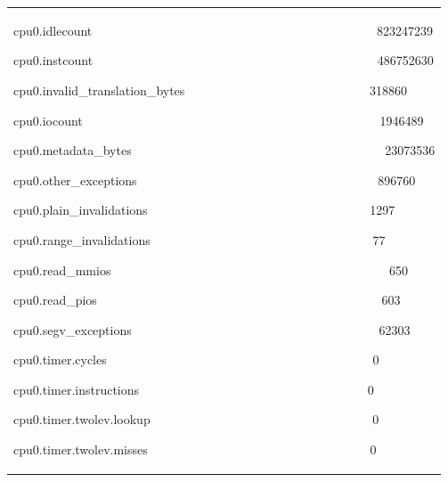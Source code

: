 \documentclass[a4paper]{article}
\begin{document}
\begin{flushleft}
\begin{tiny}
\begin{supertabular}{|m{6.34626in}|}
{\ttfamily cpu0.idlecount
\ \ \ \ \ \ \ \ \ \ \ \ \ \ \ \ \ \ \ \ \ \ \ \ \ \ \ \ \ \ \ \ \ \ \ \ \ \ \ \ \ \ \ \ \ 823247239}

{\ttfamily cpu0.instcount
\ \ \ \ \ \ \ \ \ \ \ \ \ \ \ \ \ \ \ \ \ \ \ \ \ \ \ \ \ \ \ \ \ \ \ \ \ \ \ \ \ \ \ \ \ 486752630}

{\ttfamily cpu0.invalid\_translation\_bytes
\ \ \ \ \ \ \ \ \ \ \ \ \ \ \ \ \ \ \ \ \ \ \ \ \ \ \ \ \ 318860}

{\ttfamily cpu0.iocount
\ \ \ \ \ \ \ \ \ \ \ \ \ \ \ \ \ \ \ \ \ \ \ \ \ \ \ \ \ \ \ \ \ \ \ \ \ \ \ \ \ \ \ \ \ \ \ 1946489}

{\ttfamily cpu0.metadata\_bytes
\ \ \ \ \ \ \ \ \ \ \ \ \ \ \ \ \ \ \ \ \ \ \ \ \ \ \ \ \ \ \ \ \ \ \ \ \ \ \ \ 23073536}

{\ttfamily cpu0.other\_exceptions
\ \ \ \ \ \ \ \ \ \ \ \ \ \ \ \ \ \ \ \ \ \ \ \ \ \ \ \ \ \ \ \ \ \ \ \ \ \ 896760}

{\ttfamily cpu0.plain\_invalidations
\ \ \ \ \ \ \ \ \ \ \ \ \ \ \ \ \ \ \ \ \ \ \ \ \ \ \ \ \ \ \ \ \ \ \ 1297}

{\ttfamily cpu0.range\_invalidations
\ \ \ \ \ \ \ \ \ \ \ \ \ \ \ \ \ \ \ \ \ \ \ \ \ \ \ \ \ \ \ \ \ \ \ 77}

{\ttfamily cpu0.read\_mmios
\ \ \ \ \ \ \ \ \ \ \ \ \ \ \ \ \ \ \ \ \ \ \ \ \ \ \ \ \ \ \ \ \ \ \ \ \ \ \ \ \ \ \ \ 650}

{\ttfamily cpu0.read\_pios
\ \ \ \ \ \ \ \ \ \ \ \ \ \ \ \ \ \ \ \ \ \ \ \ \ \ \ \ \ \ \ \ \ \ \ \ \ \ \ \ \ \ \ \ \ 603}

{\ttfamily cpu0.segv\_exceptions
\ \ \ \ \ \ \ \ \ \ \ \ \ \ \ \ \ \ \ \ \ \ \ \ \ \ \ \ \ \ \ \ \ \ \ \ \ \ \ 62303}

{\ttfamily cpu0.timer.cycles
\ \ \ \ \ \ \ \ \ \ \ \ \ \ \ \ \ \ \ \ \ \ \ \ \ \ \ \ \ \ \ \ \ \ \ \ \ \ \ \ \ \ 0}

{\ttfamily cpu0.timer.instructions
\ \ \ \ \ \ \ \ \ \ \ \ \ \ \ \ \ \ \ \ \ \ \ \ \ \ \ \ \ \ \ \ \ \ \ \ 0}

{\ttfamily cpu0.timer.twolev.lookup
\ \ \ \ \ \ \ \ \ \ \ \ \ \ \ \ \ \ \ \ \ \ \ \ \ \ \ \ \ \ \ \ \ \ \ 0}

{\ttfamily cpu0.timer.twolev.misses
\ \ \ \ \ \ \ \ \ \ \ \ \ \ \ \ \ \ \ \ \ \ \ \ \ \ \ \ \ \ \ \ \ \ \ 0}


\end{supertabular}
\end{tiny}
\end{flushleft}
\end{document}
